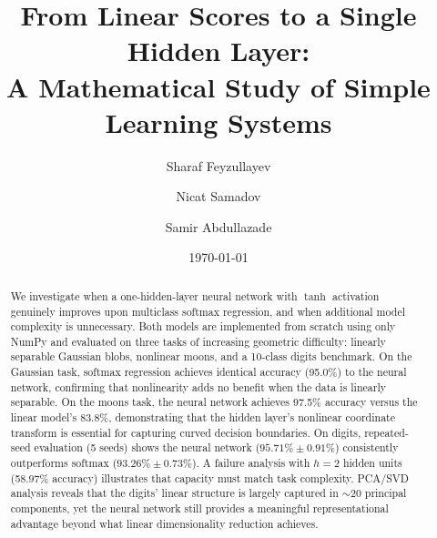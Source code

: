 \documentclass[11pt]{article}
\title{\textbf{From Linear Scores to a Single Hidden Layer:\\
A Mathematical Study of Simple Learning Systems}}
\author{Sharaf Feyzullayev \and Nicat Samadov \and Samir Abdullazade}
\date{\today}
\newcommand{\R}{\mathbb{R}}
\newcommand{\bx}{\mathbf{x}}
\newcommand{\bX}{\mathbf{X}}
\newcommand{\bW}{\mathbf{W}}
\begin{document}
\maketitle

\begin{abstract}
We investigate when a one-hidden-layer neural network with $\tanh$ activation genuinely improves upon multiclass softmax regression, and when additional model complexity is unnecessary. Both models are implemented from scratch using only NumPy and evaluated on three tasks of increasing geometric difficulty: linearly separable Gaussian blobs, nonlinear moons, and a 10-class digits benchmark. On the Gaussian task, softmax regression achieves identical accuracy (95.0\%) to the neural network, confirming that nonlinearity adds no benefit when the data is linearly separable. On the moons task, the neural network achieves 97.5\% accuracy versus the linear model's 83.8\%, demonstrating that the hidden layer's nonlinear coordinate transform is essential for capturing curved decision boundaries. On digits, repeated-seed evaluation (5 seeds) shows the neural network ($95.71\% \pm 0.91\%$) consistently outperforms softmax ($93.26\% \pm 0.73\%$). A failure analysis with $h=2$ hidden units (58.97\% accuracy) illustrates that capacity must match task complexity. PCA/SVD analysis reveals that the digits' linear structure is largely captured in $\sim$20 principal components, yet the neural network still provides a meaningful representational advantage beyond what linear dimensionality reduction achieves.
\end{abstract}
\end{document}
